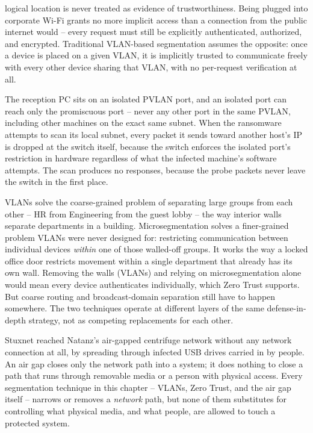 \begin{answerkey}
logical location is never treated as evidence of trustworthiness. Being plugged into corporate
Wi-Fi grants no more implicit access than a connection from the public internet would -- every
request must still be explicitly authenticated, authorized, and encrypted. Traditional VLAN-based
segmentation assumes the opposite: once a device is placed on a given VLAN, it is implicitly trusted
to communicate freely with every other device sharing that VLAN, with no per-request verification
at all.
\item The reception PC sits on an isolated PVLAN port, and an isolated port can reach only the
promiscuous port -- never any other port in the same PVLAN, including other machines on the exact
same subnet. When the ransomware attempts to scan its local subnet, every packet it sends toward
another host's IP is dropped at the switch itself, because the switch enforces the isolated port's
restriction in hardware regardless of what the infected machine's software attempts. The scan
produces no responses, because the probe packets never leave the switch in the first place.
\item VLANs solve the coarse-grained problem of separating large groups from each other -- HR from
Engineering from the guest lobby -- the way interior walls separate departments in a building.
Microsegmentation solves a finer-grained problem VLANs were never designed for: restricting
communication between individual devices \emph{within} one of those walled-off groups. It works the
way a locked office door restricts movement within a single department that already has its own
wall. Removing the walls (VLANs) and relying on microsegmentation alone would mean every device
authenticates individually, which Zero Trust supports. But coarse routing and broadcast-domain
separation still have to happen somewhere. The two techniques operate at different layers of the
same defense-in-depth strategy, not as competing replacements for each other.
\item Stuxnet reached Natanz's air-gapped centrifuge network without any network connection at
all, by spreading through infected USB drives carried in by people. An air gap closes only the
network path into a system; it does nothing to close a path that runs through removable media or a
person with physical access. Every segmentation technique in this chapter -- VLANs, Zero Trust, and
the air gap itself -- narrows or removes a \emph{network} path, but none of them substitutes for
controlling what physical media, and what people, are allowed to touch a protected system.
\end{answerkey}

